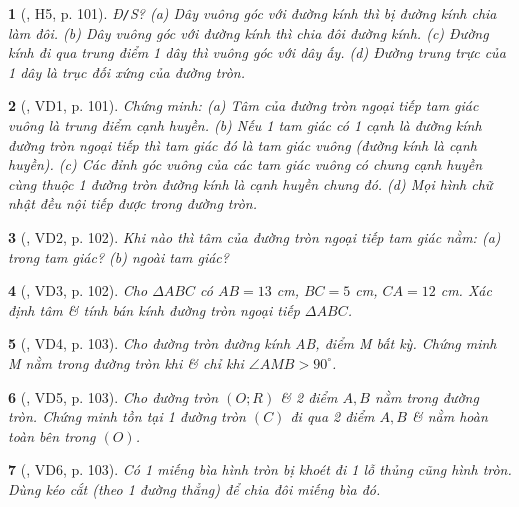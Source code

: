 \documentclass{article}
\newtheorem{baitoan}{}
\begin{document}
\begin{baitoan}[\cite{Binh_boi_duong_Toan_9_tap_1}, H5, p. 101]
	{\rm Đ{\tt/}S?} (a) Dây vuông góc với đường kính thì bị đường kính chia làm đôi. (b) Dây vuông góc với đường kính thì chia đôi đường kính. (c) Đường kính đi qua trung điểm 1 dây thì vuông góc với dây ấy. (d) Đường trung trực của 1 dây là trục đối xứng của đường tròn.
\end{baitoan}

\begin{baitoan}[\cite{Binh_boi_duong_Toan_9_tap_1}, VD1, p. 101]
	Chứng minh: (a) Tâm của đường tròn ngoại tiếp tam giác vuông là trung điểm cạnh huyền. (b) Nếu 1 tam giác có 1 cạnh là đường kính đường tròn ngoại tiếp thì tam giác đó là tam giác vuông (đường kính là cạnh huyền). (c) Các đỉnh góc vuông của các tam giác vuông có chung cạnh huyền cùng thuộc 1 đường tròn đường kính là cạnh huyền chung đó. (d) Mọi hình chữ nhật đều nội tiếp được trong đường tròn.
\end{baitoan}

\begin{baitoan}[\cite{Binh_boi_duong_Toan_9_tap_1}, VD2, p. 102]
	Khi nào thì tâm của đường tròn ngoại tiếp tam giác nằm: (a) trong tam giác? (b) ngoài tam giác?
\end{baitoan}

\begin{baitoan}[\cite{Binh_boi_duong_Toan_9_tap_1}, VD3, p. 102]
	Cho $\Delta ABC$ có $AB = 13$ {\rm cm}, $BC = 5$ {\rm cm}, $CA = 12$ {\rm cm}. Xác định tâm \& tính bán kính đường tròn ngoại tiếp $\Delta ABC$.
\end{baitoan}

\begin{baitoan}[\cite{Binh_boi_duong_Toan_9_tap_1}, VD4, p. 103]
	Cho đường tròn đường kính AB, điểm M bất kỳ. Chứng minh M nằm trong đường tròn khi \& chỉ khi $\angle{AMB} > 90^\circ$.
\end{baitoan}

\begin{baitoan}[\cite{Binh_boi_duong_Toan_9_tap_1}, VD5, p. 103]
	Cho đường tròn $(O;R)$ \& 2 điểm $A,B$ nằm trong đường tròn. Chứng minh tồn tại 1 đường tròn $(C)$ đi qua 2 điểm $A,B$ \& nằm hoàn toàn bên trong $(O)$.
\end{baitoan}

\begin{baitoan}[\cite{Binh_boi_duong_Toan_9_tap_1}, VD6, p. 103]
	Có 1 miếng bìa hình tròn bị khoét đi 1 lỗ thủng cũng hình tròn. Dùng kéo cắt (theo 1 đường thẳng) để chia đôi miếng bìa đó.
\end{baitoan}
\end{document}
